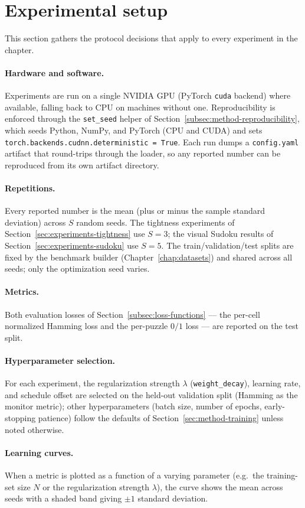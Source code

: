 \section{Experimental setup}
\label{sec:experiments-setup}

This section gathers the protocol decisions that apply to every
experiment in the chapter.

\paragraph{Hardware and software.}
Experiments are run on a single NVIDIA GPU (PyTorch \texttt{cuda}
backend) where available, falling back to CPU on machines without
one. Reproducibility is enforced through the \texttt{set\_seed}
helper of Section~\ref{subsec:method-reproducibility}, which
seeds Python, NumPy, and PyTorch (CPU and CUDA) and sets
\texttt{torch.backends.cudnn.deterministic = True}. Each run
dumps a \texttt{config.yaml} artifact that round-trips through
the loader, so any reported number can be reproduced from its
own artifact directory.

\paragraph{Repetitions.}
Every reported number is the mean (plus or minus the sample
standard deviation) across $S$ random seeds. The tightness
experiments of Section~\ref{sec:experiments-tightness} use
$S = 3$; the visual Sudoku results of
Section~\ref{sec:experiments-sudoku} use $S = 5$. The
train/validation/test splits are fixed by the benchmark
builder (Chapter~\ref{chap:datasets}) and shared across all
seeds; only the optimization seed varies.

\paragraph{Metrics.}
Both evaluation losses of
Section~\ref{subsec:loss-functions} --- the per-cell normalized
Hamming loss and the per-puzzle $0/1$ loss --- are reported on
the test split.

\paragraph{Hyperparameter selection.}
For each experiment, the regularization strength $\lambda$
(\texttt{weight\_decay}), learning rate, and schedule offset are
selected on the held-out validation split (Hamming as the
monitor metric); other hyperparameters (batch size, number of
epochs, early-stopping patience) follow the defaults of
Section~\ref{sec:method-training} unless noted otherwise.

\paragraph{Learning curves.}
When a metric is plotted as a function of a varying parameter
(e.g.\ the training-set size $N$ or the regularization strength
$\lambda$), the curve shows the mean across seeds with a shaded
band giving $\pm 1$ standard deviation.
